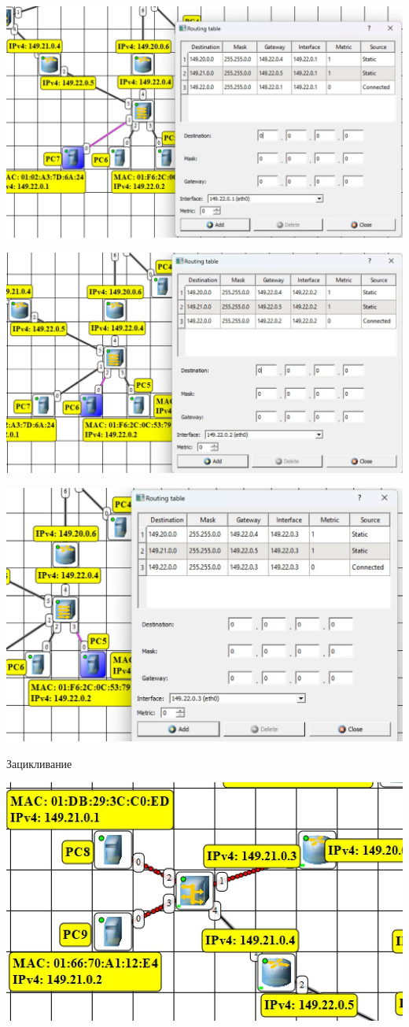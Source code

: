 \documentclass{article}
\begin{document}
\begin{center}
    \includegraphics[width=.9\textwidth]{3-2}
\end{center}
\begin{center}
    \includegraphics[width=.9\textwidth]{3-3}
\end{center}
\begin{center}
    \includegraphics[width=.9\textwidth]{3-4}
\end{center}
Зацикливание
\begin{center}
    \includegraphics[width=.9\textwidth]{3-5}
\end{center}
\end{document}
